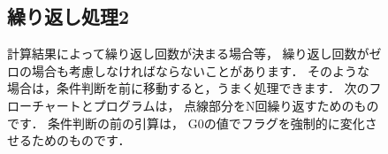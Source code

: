 \begin{figure}[btp]
\begin{framed}
\subsection*{繰り返し処理2}
計算結果によって繰り返し回数が決まる場合等，
繰り返し回数がゼロの場合も考慮しなければならないことがあります．
そのような場合は，条件判断を前に移動すると，うまく処理できます．
次のフローチャートとプログラムは，
点線部分をN回繰り返すためのものです．
条件判断の前の引算は，
G0の値でフラグを強制的に変化させるためのものです．

\begin{center}
\end{center}
\end{framed}
\end{figure}

